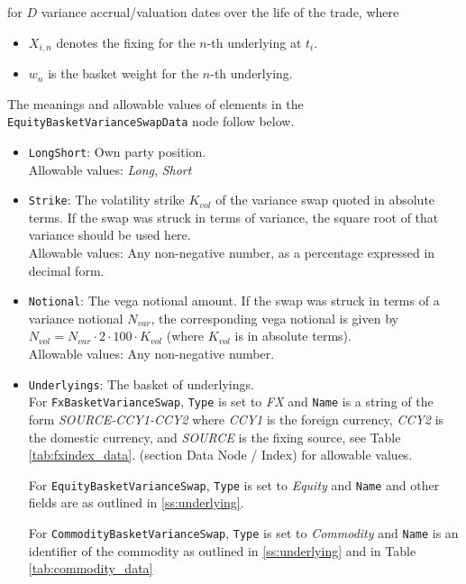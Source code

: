 for $D$ variance accrual/valuation dates over the life of the trade, where

\begin{itemize}
  \item $X_{i,n}$ denotes the fixing for the $n$-th underlying at $t_i$.
  \item $w_n$ is the basket weight for the $n$-th underlying.
\end{itemize}

The meanings and allowable values of elements in the \lstinline!EquityBasketVarianceSwapData! node follow below.

\begin{itemize}
  \item{} \lstinline!LongShort!: Own party position. \\
    Allowable values: \emph{Long}, \emph{Short}
  \item{} \lstinline!Strike!: The volatility strike $K_{vol}$ of the variance swap quoted in absolute terms.
  If the swap was struck in terms of variance, the square root of that variance should be used here. \\
  Allowable values: Any non-negative number, as a percentage expressed in decimal form.
  \item{} \lstinline!Notional!: The vega notional amount. If the swap was struck in terms of a variance notional
  $N_{var}$, the corresponding vega notional is given by $N_{vol} = N_{var} \cdot 2 \cdot 100 \cdot K_{vol}$ (where
  $K_{vol}$ is in absolute terms). \\
  Allowable values: Any non-negative number.
  \item \lstinline!Underlyings!: The basket of underlyings. \\
    For \lstinline!FxBasketVarianceSwap!, \lstinline!Type! is set to \emph{FX}
    and \lstinline!Name! is a string of the form \emph{SOURCE-CCY1-CCY2} where \emph{CCY1} is
    the foreign currency, \emph{CCY2} is the domestic currency, and \emph{SOURCE} is the fixing
    source, see Table \ref{tab:fxindex_data}.
    (section Data Node / Index) for allowable values.

    For \lstinline!EquityBasketVarianceSwap!, \lstinline!Type! is set to \emph{Equity} and
    \lstinline!Name! and other fields are as outlined in \ref{ss:underlying}.

    For \lstinline!CommodityBasketVarianceSwap!, \lstinline!Type! is set to \emph{Commodity} and
    \lstinline!Name! is an identifier of the commodity as outlined in \ref{ss:underlying} and
    in Table \ref{tab:commodity_data}


\end{itemize}
